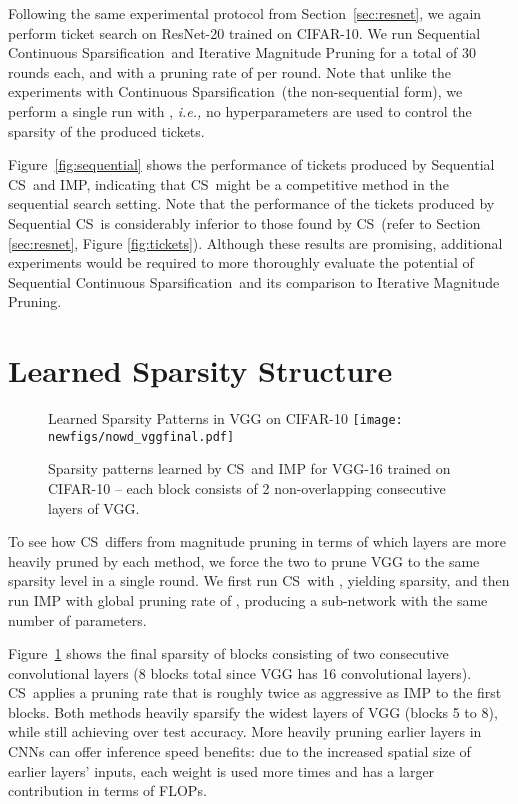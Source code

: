 \documentclass{article}
\newcommand{\ie}{\textit{i.e.,} }
\newcommand{\method}{Continuous Sparsification}
\newcommand{\methodacro}{CS}
\begin{document}
Following the same experimental protocol from Section~\ref{sec:resnet}, we again perform ticket search on ResNet-20 trained on CIFAR-10.  We run Sequential \method~and Iterative Magnitude Pruning for a total of 30 rounds each, and with a pruning rate of  per round. Note that unlike the experiments with \method~(the non-sequential form), we perform a single run with , \ie no hyperparameters are used to control the sparsity of the produced tickets.

Figure~\ref{fig:sequential} shows the performance of tickets produced by Sequential \methodacro~and IMP, indicating that \methodacro~might be a competitive method in the sequential search setting. Note that the performance of the tickets produced by Sequential \methodacro~is considerably inferior to those found by \methodacro~(refer to Section \ref{sec:resnet}, Figure \ref{fig:tickets}). Although these results are promising, additional experiments would be required to more thoroughly evaluate the potential of Sequential \method~and its comparison to Iterative Magnitude Pruning.

\section{Learned Sparsity Structure}
\label{app:sparsities}

\begin{figure}[!t]
    \centering
    \footnotesize{\textsf{Learned Sparsity Patterns in VGG on CIFAR-10}}
     \texttt{[image: newfigs/nowd\_vggfinal.pdf]}
    \caption{Sparsity patterns learned by \methodacro~and IMP for VGG-16 trained on CIFAR-10 -- each block consists of 2 non-overlapping consecutive layers of VGG.}
    \label{fig:learnedsparsities}
\end{figure}

To see how \methodacro~differs from magnitude pruning in terms of which layers are more heavily pruned by each method, we force the two to prune VGG to the same sparsity level in a single round. We first run \methodacro~with , yielding  sparsity, and then run IMP with global pruning rate of , producing a sub-network with the same number of parameters.

Figure~\ref{fig:learnedsparsities} shows the final sparsity of blocks consisting of two consecutive convolutional layers (8 blocks total since VGG has 16 convolutional layers). \methodacro~applies a pruning rate that is roughly twice as aggressive as IMP to the first blocks. Both methods heavily sparsify the widest layers of VGG (blocks 5 to 8), while still achieving over  test accuracy. More heavily pruning earlier layers in CNNs can offer inference speed benefits: due to the increased spatial size of earlier layers' inputs, each weight is used more times and has a larger contribution in terms of FLOPs.
 
\end{document}
